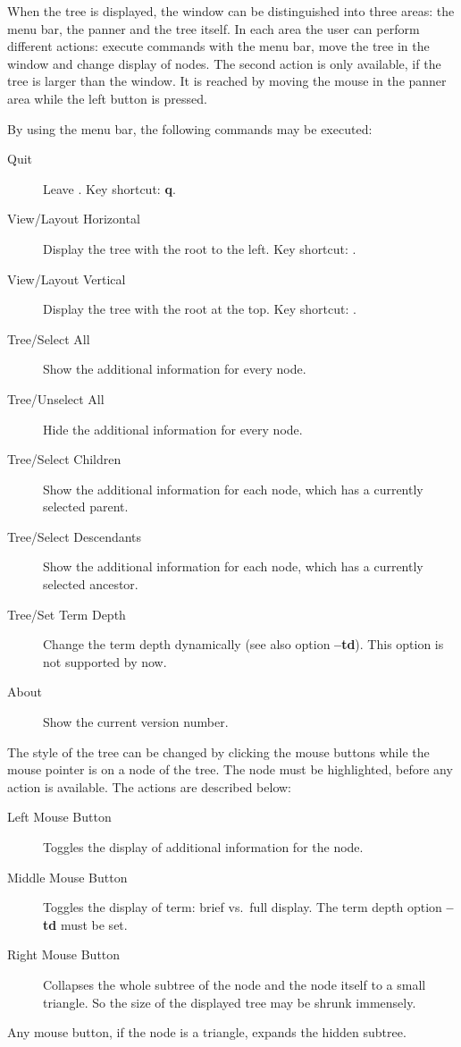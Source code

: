 When the tree is displayed, the window can be  distinguished
into  three  areas:   the  menu bar, the panner and the tree
itself. In each area the user can perform different actions:
execute  commands  with  the  menu bar, move the tree in the
window and change display of nodes.  The  second  action  is
only available, if the tree is larger than the window. It is
reached by moving the mouse in the  panner  area  while  the
left button is pressed.

By using the menu bar, the following commands  may  be executed:
\begin{description}
      \item[Quit]
           {Leave \xp. Key shortcut: {\bf q}.}
      \item[View/Layout Horizontal]
           {Display the tree  with  the  root  to  the  left.   Key
            shortcut: \Cc.}
      \item[View/Layout Vertical]
           {Display the  tree  with  the  root  at  the  top.   Key
            shortcut: \Cv.}
      \item[Tree/Select All]
           {Show the additional information for every node.}
      \item[Tree/Unselect All]
           {Hide the additional information for every node.}
      \item[Tree/Select Children]
           {Show the additional information for  each  node,  which
            has a currently selected parent.}
      \item[Tree/Select Descendants]
           {Show the additional information for  each  node,  which
            has a currently selected ancestor.}
      \item[Tree/Set Term Depth]
           {Change the term depth dynamically (see also option {\bf --td}). 
            This option is not supported by now.}
      \item[About]
           {Show the current version number.}
\end{description}

The style of the tree can be changed by clicking  the  mouse
buttons  while  the  mouse pointer is on a node of the tree.
The node must be highlighted, before any  action  is
available. The actions are described below:
\begin{description}
      \item[Left Mouse Button]
           {Toggles the display of additional information for the node.}
      \item[Middle Mouse Button]
           {Toggles the display of term: brief vs.\ full display.
            The term depth option {\bf --td} must be set.}
      \item[Right Mouse Button]
           {Collapses the whole subtree of the node  and  the  node
            itself  to  a  small  triangle.  So  the  size  of  the
            displayed tree may be shrunk immensely.}
\end{description}

Any mouse button, if the node is a triangle, expands the hidden
subtree. 

